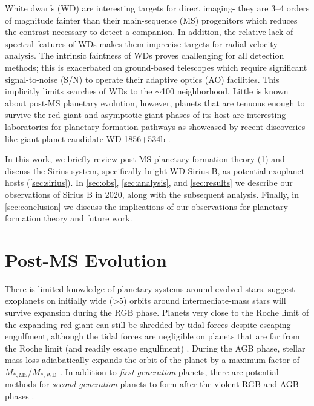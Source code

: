 \documentclass[twocolumn,linenumbers]{aastex631}
\begin{document}
White dwarfs (WD) are interesting targets for direct imaging- they are \numrange{3}{4} orders of magnitude fainter than their main-sequence (MS) progenitors which reduces the contrast necessary to detect a companion. In addition, the relative lack of spectral features of WDs makes them imprecise targets for radial velocity analysis. The intrinsic faintness of WDs proves challenging for all detection methods; this is exacerbated on ground-based telescopes which require significant signal-to-noise (S/N) to operate their adaptive optics (AO) facilities. This implicitly limits searches of WDs to the $\sim$\qty{100}{\parsec} neighborhood. Little is known about post-MS planetary evolution, however, planets that are tenuous enough to survive the red giant and asymptotic giant phases of its host are interesting laboratories for planetary formation pathways as showcased by recent discoveries like giant planet candidate WD 1856+534b \citep{vanderburgGiantPlanetCandidate2020}.

In this work, we briefly review post-MS planetary formation theory (\cref{sec:post-ms}) and discuss the Sirius system, specifically bright WD Sirius B, as potential exoplanet hosts (\cref{sec:sirius}). In \cref{sec:obs}, \cref{sec:analysis}, and \cref{sec:results} we describe our observations of Sirius B in 2020, along with the subsequent analysis. Finally, in \cref{sec:conclusion} we discuss the implications of our observations for planetary formation theory and future work.

\section{Post-MS Evolution} \label{sec:post-ms}

There is limited knowledge of planetary systems around evolved stars. \citet{burleighImagingPlanetsNearby2002a,verasPostmainsequencePlanetarySystem2016} suggest exoplanets on initially wide (\textgreater\qty{5}{\au}) orbits around intermediate-mass stars will survive expansion during the RGB phase. Planets very close to the Roche limit of the expanding red giant can still be shredded by tidal forces despite escaping engulfment, although the tidal forces are negligible on planets that are far from the Roche limit (and readily escape engulfment) \citep{nordhausOrbitsLowmassCompanions2013}. During the AGB phase, stellar mass loss adiabatically expands the orbit of the planet by a maximum factor of $M_{*,\mathrm{MS}}/M_{*,\mathrm{WD}}$ \citep{jeansCosmogonicProblemsAssociated1924}. In addition to \textit{first-generation} planets, there are potential methods for \textit{second-generation} planets to form after the violent RGB and AGB phases \citep{peretsSecondGenerationPlanets2010}.
\end{document}
